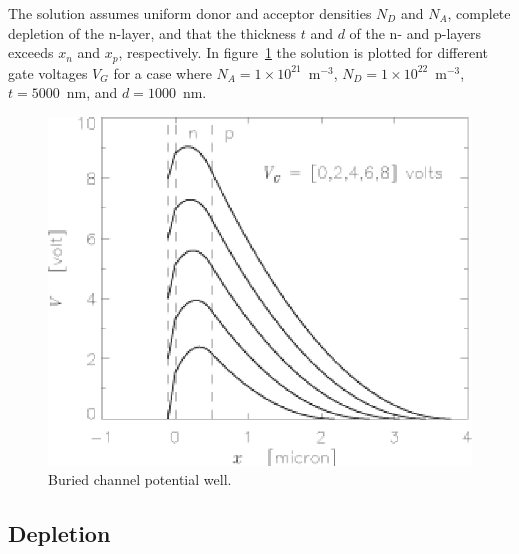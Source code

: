 The solution assumes uniform donor and acceptor densities $N_D$ and
$N_A$, complete depletion of the n-layer, and that the thickness $t$
and $d$ of the n- and p-layers exceeds $x_n$ and $x_p$, respectively.
In figure~\ref{CCD.figburchan} the solution is plotted for different
gate voltages $V_G$ for a case where 
$N_A = 1\times 10^{21}$~m$^{-3}$, $N_D = 1\times 10^{22}$~m$^{-3}$, 
$t = 5000$~nm, and $d = 1000$~nm.

\begin{figure}[h]
  \centering
	\includegraphics{CCD_burchan.eps}
  \caption{Buried channel potential well.}
  \label{CCD.figburchan}
\end{figure}


\subsection{Depletion}

